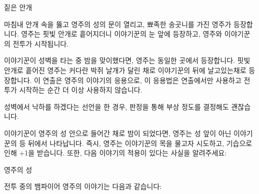 \documentclass{report}
\begin{document}
	\begin{lite}{짙은 안개}
	\end{lite}
	
	마침내 안개 속을 뚫고 영주의 성의 문이 열리고, 뾰족한 송곳니를 가진 영주가 등장합니다. 영주는 핏빛 안개로 흩어지더니 이야기꾼의 눈 앞에 등장하고, 영주와 이야기꾼의 전투가 시작됩니다.
	
	\medskip
	
	이야기꾼이 성벽을 타는 중 밤을 맞이했다면, 영주는 동일한 곳에서 등장합니다. 핏빛 안개로 흩어진 영주는 커다란 박쥐 날개가 달린 채로 이야기꾼의 뒤에 날고있는채로 등장합니다. 이 연출은 영주의  이야기의 응용으로, 이 응용법은 연출에서만 사용하고 전투가 시작하는 순간 더 이상 사용하지 않습니다.
	
	성벽에서 낙하를 하겠다는 선언을 한 경우, 판정을 통해 부상 정도를 결정해도 괜찮습니다.
	
	\medskip
	
	이야기꾼이 영주의 성 안으로 들어간 채로 밤이 되었다면, 영주는 성 앞이 아닌 이야기꾼의 등 뒤에서 나타납니다. 즉시, 영주는 이야기꾼의 목을 물고자 시도하고, 기습으로 인해 +1을 받습니다. 또한, 다음 이야기의 적용이 있다는 사실을 알려주세요:
	
	\begin{lite}{영주의 성}
	\end{lite}
	
	전투 중의 뱀파이어 영주의 이야기는 다음과 같습니다:
	
\end{document}
